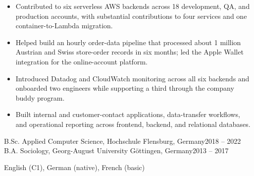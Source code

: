 \documentclass[10pt,letterpaper]{article}
\begin{document}
\begin{itemize}
  \item Contributed to six serverless AWS backends across 18 development, QA, and production accounts, with substantial contributions to four services and one container-to-Lambda migration.
  \item Helped build an hourly order-data pipeline that processed about 1 million Austrian and Swiss store-order records in six months; led the Apple Wallet integration for the online-account platform.
  \item Introduced Datadog and CloudWatch monitoring across all six backends and onboarded two engineers while supporting a third through the company buddy program.
\end{itemize}

\begin{itemize}
  \item Built internal and customer-contact applications, data-transfer workflows, and operational reporting across frontend, backend, and relational databases.
\end{itemize}

B.Sc. Applied Computer Science, Hochschule Flensburg, Germany\hfill 2018 -- 2022\\
B.A. Sociology, Georg-August University G\"ottingen, Germany\hfill 2013 -- 2017\par

English (C1), German (native), French (basic)\par
\end{document}

